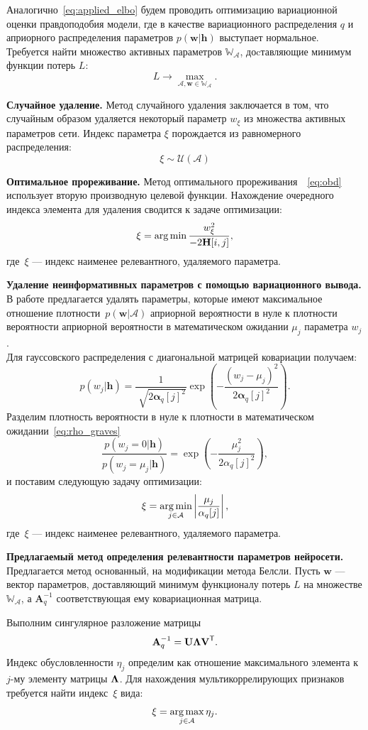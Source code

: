 Аналогично~\eqref{eq:applied_elbo} будем проводить оптимизацию вариационной оценки правдоподобия модели, где в качестве вариационного распределения $q$ и априорного распределения параметров $p(\mathbf{w}|\mathbf{h})$ выступает нормальное.
Требуется найти множество активных параметров $\mathbb{W}_{\mathcal{A}}$, доcтавляющие минимум функции потерь $L$:
$$
    L \to \max_{\mathcal{A}, \mathbf{w} \in \mathbb{W}_{\mathcal{A}}}.
$$


\textbf{Случайное удаление. }
Метод случайного удаления заключается в том, что случайным образом удаляется некоторый параметр $w_{\xi}$ из множества активных параметров сети.  Индекс параметра $\xi$ порождается из равномерного распределения:
$$\xi \sim \mathcal{U}(\mathcal{A})$$

\textbf{Оптимальное прореживание. }
Метод оптимального прореживания~\cite{obd}~\eqref{eq:obd} использует вторую производную целевой функции.
Нахождение очередного индекса элемента для удаления сводится к задаче оптимизации:
\[
    \xi = \operatorname*{arg\,min} \frac{w_{\xi}^2}{-2\mathbf{H}[i,j]},
\]
где~$\xi$ --- индекс наименее релевантного, удаляемого параметра.

\textbf{Удаление неинформативных параметров с помощью вариационного вывода. }
В работе \cite{nips} предлагается удалять параметры, которые имеют максимальное отношение плотности~$p(\textbf{w}|\mathcal{A})$ априорной вероятности в нуле к плотности вероятности априорной вероятности в математическом ожидании $\mu_j$ параметра $w_j$.\\
Для гауссовского распределения с диагональной матрицей ковариации получаем:
$$p(w_j|\mathbf{h}) = \frac{1}{\sqrt[]{2\boldsymbol{\alpha}_q[j]^2}}\exp({-\frac{(w_j-\mu_j)^2}{2\boldsymbol{\alpha}_q[j]^2}}).$$
Разделим плотность вероятности в нуле к плотности в математическом ожидании~\eqref{eq:rho_graves}
$$ \frac{p(w_j=0|\mathbf{h})}{p(w_j=\mu_j|\mathbf{h})}= \exp\left({-\frac{\mu_j^2}{2\alpha_q[j]^2}}\right),$$
и поставим следующую задачу оптимизации:
$$\xi = \operatorname*{arg\,min}_{j\in \mathcal{A}} \left|\frac{\mu_j}{\alpha_q[j]}\right|,$$
где~$\xi$ --- индекс наименее релевантного, удаляемого параметра.

\textbf{Предлагаемый метод определения релевантности параметров нейросети. }
Предлагается метод основанный, на модификации метода Белсли. Пусть $\mathbf{w}$ --- вектор параметров, доставляющий минимум функционалу потерь $L$ на  множестве $\mathbb{W_\mathcal{A}}$, а $\mathbf{A}^{-1}_q$ соответствующая ему ковариационная матрица.

Выполним сингулярное разложение матрицы
$$\textbf{A}^{-1}_q = \textbf{U}{\bf\Lambda}\textbf{V}^\mathsf{T}.$$
Индекс обусловленности $\eta_j$ определим как отношение максимального элемента к $j$-му элементу матрицы ${\bf\Lambda}$. Для нахождения мультикоррелирующих признаков требуется найти индекс~$\xi$ вида:
$$\xi = \operatorname*{arg\,max}_{j\in \mathcal{A}}{\eta_j}. $$

